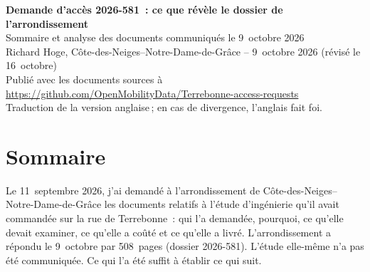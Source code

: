 \documentclass[11pt,letterpaper]{article}
\newcommand{\repourl}{https://github.com/OpenMobilityData/Terrebonne-access-requests}
\newcommand{\repo}[1]{\href{\repourl}{#1}}
\begin{document}
\begin{center}
{\Large\bfseries Demande d'accès 2026-581~: ce que révèle le dossier de l'arrondissement}\\[0.4em]
{\large Sommaire et analyse des documents communiqués le 9~octobre 2026}\\[0.6em]
Richard Hoge, Côte-des-Neiges--Notre-Dame-de-Grâce -- 9~octobre 2026 (révisé le 16~octobre)\\
Publié avec les documents sources à \repo{\repourl}\\
{\small Traduction de la version anglaise\,; en cas de divergence, l'anglais fait foi.}
\end{center}

\section*{Sommaire}

Le 11~septembre 2026, j'ai demandé à l'arrondissement de Côte-des-Neiges--Notre-Dame-de-Grâce
les documents relatifs à l'étude d'ingénierie qu'il avait commandée sur la
rue de Terrebonne~: qui l'a demandée, pourquoi, ce qu'elle devait examiner,
ce qu'elle a coûté et ce qu'elle a livré. L'arrondissement a répondu le
9~octobre par 508~pages (dossier 2026-581). L'étude elle-même n'a pas été
communiquée. Ce qui l'a été suffit à établir ce qui suit.
\end{document}
